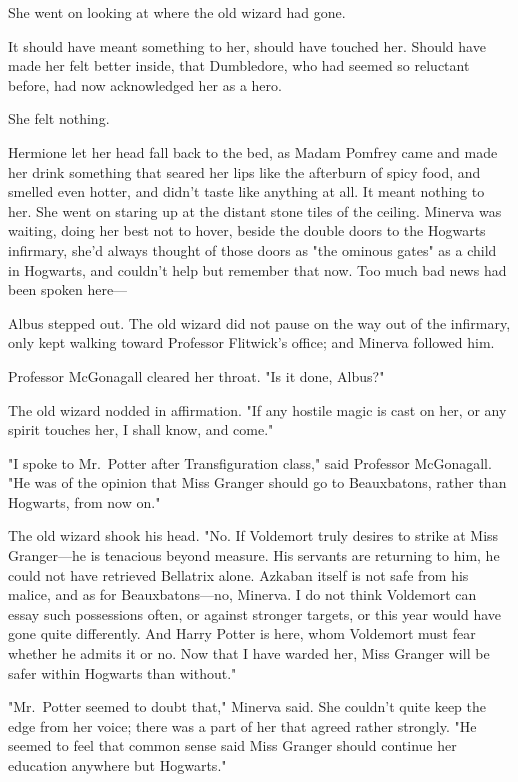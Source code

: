 She went on looking at where the old wizard had gone.

It should have meant something to her, should have touched her. Should have 
made her felt better inside, that Dumbledore, who had seemed so reluctant 
before, had now acknowledged her as a hero.

She felt nothing.

Hermione let her head fall back to the bed, as Madam Pomfrey came and made her 
drink something that seared her lips like the afterburn of spicy food, and 
smelled even hotter, and didn't taste like anything at all. It meant nothing to 
her. She went on staring up at the distant stone tiles of the ceiling.
\sbreak
Minerva was waiting, doing her best not to hover, beside the double doors to 
the Hogwarts infirmary, she'd always thought of those doors as "the ominous 
gates" as a child in Hogwarts, and couldn't help but remember that now. Too 
much bad news had been spoken here---

Albus stepped out. The old wizard did not pause on the way out of the 
infirmary, only kept walking toward Professor Flitwick's office; and Minerva 
followed him.

Professor McGonagall cleared her throat. "Is it done, Albus?"

The old wizard nodded in affirmation. "If any hostile magic is cast on her, or 
any spirit touches her, I shall know, and come."

"I spoke to Mr.~Potter after Transfiguration class," said Professor McGonagall. 
"He was of the opinion that Miss Granger should go to Beauxbatons, rather than 
Hogwarts, from now on."

The old wizard shook his head. "No. If Voldemort truly desires to strike at 
Miss Granger---he is tenacious beyond measure. His servants are returning to 
him, he could not have retrieved Bellatrix alone. Azkaban itself is not safe 
from his malice, and as for Beauxbatons---no, Minerva. I do not think Voldemort 
can essay such possessions often, or against stronger targets, or this year 
would have gone quite differently. And Harry Potter is here, whom Voldemort 
must fear whether he admits it or no. Now that I have warded her, Miss Granger 
will be safer within Hogwarts than without."

"Mr.~Potter seemed to doubt that," Minerva said. She couldn't quite keep the 
edge from her voice; there was a part of her that agreed rather strongly. "He 
seemed to feel that common sense said Miss Granger should continue her 
education anywhere but Hogwarts."


